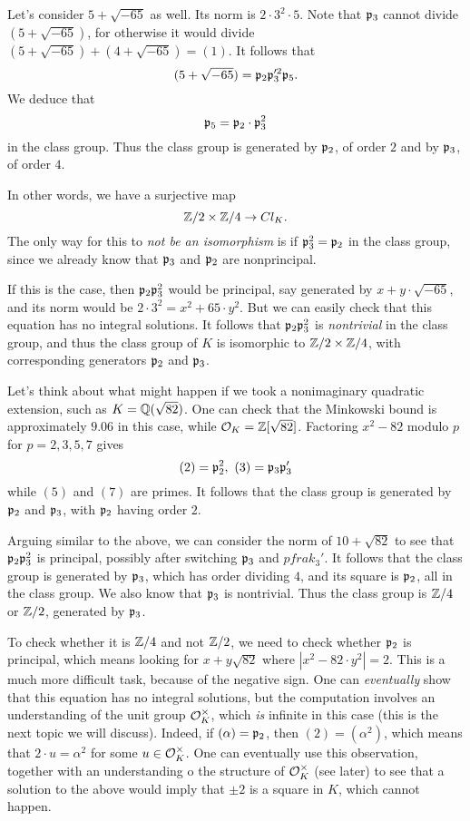 Let's consider $5 + \sqrt{-65}$ as well.
Its norm is $2 \cdot 3^{2} \cdot 5$.
Note that $\mathfrak{p}_{3}$ cannot divide $(5 + \sqrt{-65})$, for otherwise it would divide $(5 + \sqrt{-65}) + (4 + \sqrt{-65}) = (1)$.
It follows that
\[ (5 + \sqrt{-65}) = \mathfrak{p}_{2} \mathfrak{p}_{3}'^{2} \mathfrak{p}_{5}. \]
We deduce that
\[ \mathfrak{p}_{5} = \mathfrak{p}_{2} \cdot \mathfrak{p}_{3}^{2} \]
in the class group.
Thus the class group is generated by $\mathfrak{p}_{2}$, of order $2$ and by $\mathfrak{p}_{3}$, of order $4$.

In other words, we have a surjective map
\[ \mathbb{Z}/2 \times \mathbb{Z}/4 \to Cl_{K}. \]
The only way for this to \emph{not be an isomorphism} is if $\mathfrak{p}_{3}^{2} = \mathfrak{p}_{2}$ in the class group, since we already know that $\mathfrak{p}_{3}$ and $\mathfrak{p}_{2}$ are nonprincipal.

If this is the case, then $\mathfrak{p}_{2} \mathfrak{p}_{3}^{2}$ would be principal, say generated by $x + y \cdot \sqrt{-65}$, and its norm would be $2 \cdot 3^{2} = x^{2} + 65 \cdot y^{2}$.
But we can easily check that this equation has no integral solutions.
It follows that $\mathfrak{p}_{2} \mathfrak{p}_{3}^{2}$ is \emph{nontrivial} in the class group, and thus the class group of $K$ is isomorphic to $\mathbb{Z}/2 \times \mathbb{Z}/4$, with corresponding generators $\mathfrak{p}_{2}$ and $\mathfrak{p}_{3}$.

Let's think about what might happen if we took a nonimaginary quadratic extension, such as $K = \mathbb{Q}(\sqrt{82})$.
One can check that the Minkowski bound is approximately $9.06$ in this case, while $\mathcal{O}_{K} = \mathbb{Z}[\sqrt{82}]$.
Factoring $x^{2}-82$ modulo $p$ for $p = 2,3,5,7$ gives
\[ (2) = \mathfrak{p}_{2}^{2}, \ (3) = \mathfrak{p}_{3} \mathfrak{p}_{3}' \]
while $(5)$ and $(7)$ are primes.
It follows that the class group is generated by $\mathfrak{p}_{2}$ and $\mathfrak{p}_{3}$, with $\mathfrak{p}_{2}$ having order $2$.

Arguing similar to the above, we can consider the norm of $10 + \sqrt{82}$ to see that $\mathfrak{p}_{2} \mathfrak{p}_{3}^{2}$ is principal, possibly after switching $\mathfrak{p}_{3}$ and $pfrak_{3}'$.
It follows that the class group is generated by $\mathfrak{p}_{3}$, which has order dividing $4$, and its square is $\mathfrak{p}_{2}$, all in the class group.
We also know that $\mathfrak{p}_{3}$ is nontrivial.
Thus the class group is $\mathbb{Z}/4$ or $\mathbb{Z}/2$, generated by $\mathfrak{p}_{3}$.

To check whether it is $\mathbb{Z}/4$ and not $\mathbb{Z}/2$, we need to check whether $\mathfrak{p}_{2}$ is principal, which means looking for $x + y \sqrt{82}$ where $|x^{2} - 82 \cdot y^{2}| = 2$.
This is a much more difficult task, because of the negative sign.
One can \emph{eventually} show that this equation has no integral solutions, but the computation involves an understanding of the unit group $\mathcal{O}_{K}^{\times}$, which \emph{is} infinite in this case (this is the next topic we will discuss).
Indeed, if $(\alpha) = \mathfrak{p}_{2}$, then $(2) = (\alpha^{2})$, which means that $2 \cdot u = \alpha^{2}$ for some $u \in \mathcal{O}_{K}^{\times}$.
One can eventually use this observation, together with an understanding o the structure of $\mathcal{O}_{K}^{\times}$ (see later) to see that a solution to the above would imply that $\pm 2$ is a square in $K$, which cannot happen.


